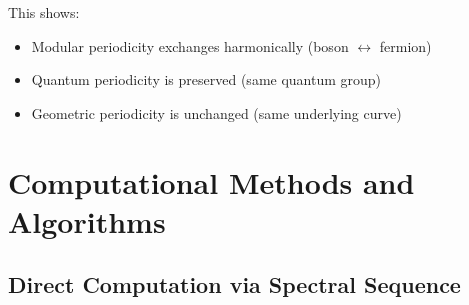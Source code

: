 This shows:
\begin{itemize}
\item Modular periodicity exchanges harmonically (boson $\leftrightarrow$ fermion)
\item Quantum periodicity is preserved (same quantum group)
\item Geometric periodicity is unchanged (same underlying curve)
\end{itemize}

\section{Computational Methods and Algorithms}

\subsection{Direct Computation via Spectral Sequence}

